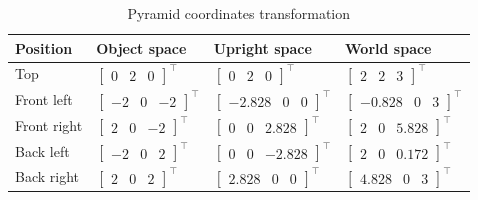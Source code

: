 \begin{table}[H]
\centering
\begin{tabular}{|l|l|l|l|}
\hline
\textbf{Position} & \textbf{Object space} & \textbf{Upright space} & \textbf{World space} \\ \hline
Top & $\begin{bmatrix}0 & 2 & 0\end{bmatrix}^\intercal$ & $\begin{bmatrix}0 & 2 & 0\end{bmatrix}^\intercal$ & $\begin{bmatrix}2 & 2 & 3\end{bmatrix}^\intercal$ \\ \hline
Front left & $\begin{bmatrix}-2 & 0 & -2\end{bmatrix}^\intercal$ & $\begin{bmatrix}-2.828 & 0 & 0\end{bmatrix}^\intercal$ & $\begin{bmatrix}-0.828 & 0 & 3\end{bmatrix}^\intercal$ \\ \hline
Front right & $\begin{bmatrix}2 & 0 & -2\end{bmatrix}^\intercal$ & $\begin{bmatrix}0 & 0 & 2.828\end{bmatrix}^\intercal$ & $\begin{bmatrix}2 & 0 & 5.828\end{bmatrix}^\intercal$ \\ \hline
Back left & $\begin{bmatrix}-2 & 0 & 2\end{bmatrix}^\intercal$ & $\begin{bmatrix}0 & 0 & -2.828\end{bmatrix}^\intercal$ & $\begin{bmatrix}2 & 0 & 0.172\end{bmatrix}^\intercal$ \\ \hline
Back right & $\begin{bmatrix}2 & 0 & 2\end{bmatrix}^\intercal$ & $\begin{bmatrix}2.828 & 0 & 0\end{bmatrix}^\intercal$ & $\begin{bmatrix}4.828 & 0 & 3\end{bmatrix}^\intercal$ \\ \hline
\end{tabular}
\caption{Pyramid coordinates transformation}
\label{tab:pyramid-coordinates-transformation}
\end{table}

